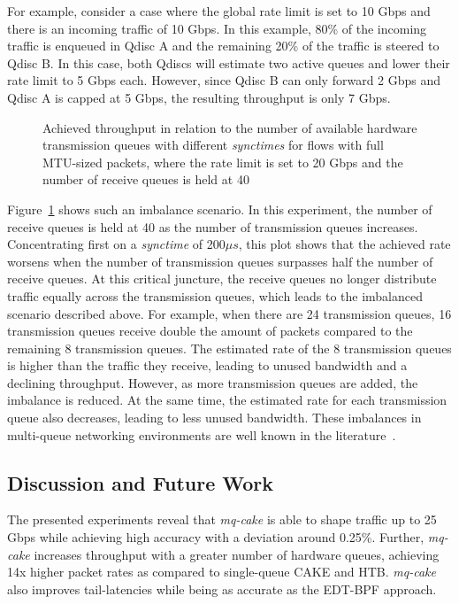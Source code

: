 For example, consider a case where the global rate limit is set to 10 Gbps and there is an incoming traffic of 10 Gbps.
%
In this example, 80\% of the incoming traffic is enqueued in Qdisc A and the remaining 20\% of the traffic is steered to Qdisc B. In this case, both Qdiscs will estimate two active queues and lower their rate limit to 5 Gbps each.
However, since Qdisc B can only forward 2 Gbps and Qdisc A is capped at 5 Gbps, the resulting throughput is only 7 Gbps.
%
\begin{figure}[H]
    \centering
    
    \caption{Achieved throughput in relation to the number of available hardware transmission queues with different \textit{synctimes} for flows with full MTU-sized packets, where the rate limit is set to 20 Gbps and the number of receive queues is held at 40}\label{fig:txq_imbalance_1514}
\end{figure}
Figure~\ref{fig:txq_imbalance_1514} shows such an imbalance scenario.
%
In this experiment, the number of receive queues is held at 40 as the number of transmission queues increases.
%
Concentrating first on a \textit{synctime} of 200$\mu s$, this plot shows that the achieved rate worsens when the number of transmission queues surpasses half the number of receive queues.
%
At this critical juncture, the receive queues no longer distribute traffic equally across the transmission queues, which leads to the imbalanced scenario described above.
%
For example, when there are 24 transmission queues, 16 transmission queues receive double the amount of packets compared to the remaining 8 transmission queues.
%
The estimated rate of the 8 transmission queues is higher than the traffic they receive, leading to unused bandwidth and a declining throughput.
%
However, as more transmission queues are added, the imbalance is reduced. At the same time, the estimated rate for each transmission queue also decreases, leading to less unused bandwidth. 
%
These imbalances in multi-queue networking environments are well known in the literature~\cite{titan, loom, silo}.
%

\subsection{Discussion and Future Work}
The presented experiments reveal that \textit{mq-cake} is able to shape traffic up to 25 Gbps while achieving high accuracy with a deviation around 0.25\%.
%
Further, \textit{mq-cake} increases throughput with a greater number of hardware queues, achieving 14x higher packet rates as compared to single-queue CAKE and HTB.
%
\textit{mq-cake} also improves tail-latencies while being as accurate as the EDT-BPF approach.

